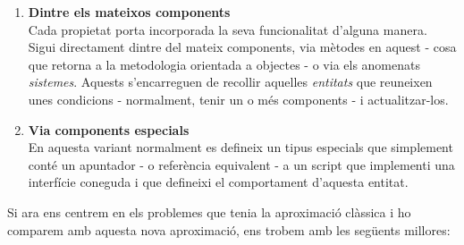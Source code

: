 \begin{enumerate}
  \item {\bf Dintre els mateixos components} \hfill \\
    Cada propietat porta incorporada la seva funcionalitat d'alguna manera. Sigui directament dintre del mateix components, via mètodes en aquest - cosa que retorna a la metodologia orientada a objectes - o via els anomenats {\em sistemes}. Aquests s'encarreguen de recollir aquelles {\em entitats} que reuneixen unes condicions - normalment, tenir un o més components - i actualitzar-los.
    
  \item {\bf Via components especials} \hfill \\
    En aquesta variant normalment es defineix un tipus especials que simplement conté un apuntador - o referència equivalent - a un script que implementi una interfície coneguda i que defineixi el comportament d'aquesta entitat.
    
\end{enumerate}

Si ara ens centrem en els problemes que tenia la aproximació clàssica i ho comparem amb aquesta nova aproximació, ens trobem amb les següents millores:

